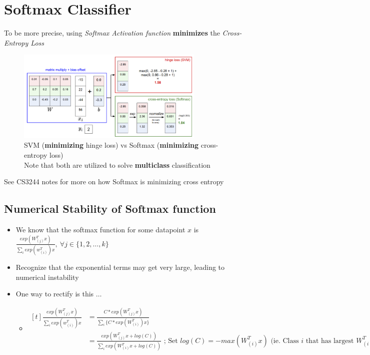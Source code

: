 \documentclass{article}
\begin{document}
\newpage
\section{Softmax Classifier}
To be more precise, using \textit{Softmax Activation function} \textbf{minimizes} the \textit{Cross-Entropy Loss}

\begin{figure}[htp]
    \centering
    \includegraphics[width=9cm, scale=1]{images/hinge_to_cross.PNG}
    \captionsetup{justification=centering}
    \caption{SVM (\textbf{minimizing} hinge loss) vs Softmax (\textbf{minimizing} cross-entropy loss)\\
                Note that both are utilized to solve \textbf{multiclass} classification}
\end{figure}

 See CS3244 notes for more on how Softmax is minimizing cross entropy

\subsection{Numerical Stability of Softmax function}

\begin{itemize}
    \item We know that the softmax function for some datapoint $x$ is $\frac{exp(W_{(j)}^{T}x)}{\sum\limits_{i}exp(w_{(i)}^{T})x}, \ \forall j \in \{1,2, \dots, k\}$
    \item Recognize that the exponential terms may get very large, leading to numerical instability
    \item One way to rectify is this $\dots$
        \begin{itemize}
            \item[] $\begin{aligned}[t]
                        \frac{exp(W_{(j)}^{T}x)}{\sum\limits_{i}exp(w_{(i)}^{T})x} &= \frac{C * exp(W_{(j)}^{T}x)}{\sum\limits_{i}\bigl\{ C * exp(W_{(i)}^{T})x \bigr\}}\\
                                                                                   &= \frac{exp(W_{(j)}^{T}x + log (C))}{\sum\limits_{i}exp(W_{(i)}^{T}x + log(C))} \text{ ; Set $log(C) = -max(W_{(i)}^{T}x)$ (ie. Class $i$ that has largest $W_{(i)}^{T}x$ score)}
                    \end{aligned}$
        \end{itemize}
\end{itemize}
\end{document}

